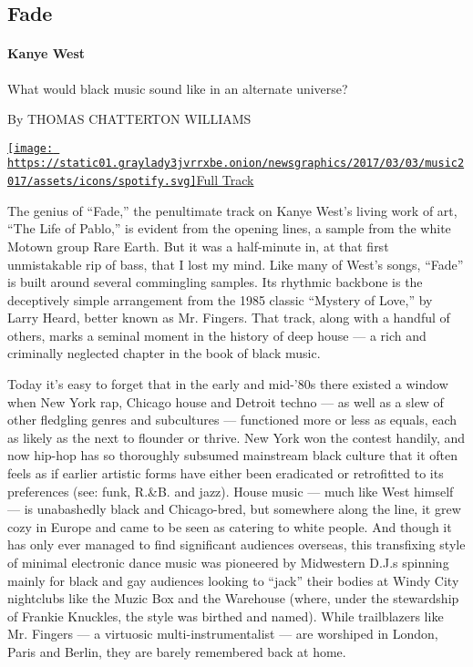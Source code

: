 \hypertarget{--fade}{%
\subsection{\texorpdfstring{ Fade}{  Fade}}\label{--fade}}

\hypertarget{kanye-west}{%
\paragraph{Kanye West}\label{kanye-west}}

What would black music sound like in an alternate universe?

By THOMAS CHATTERTON WILLIAMS

\href{https://open.spotify.com/track/3cCxoOgfi6hgt8MNteuiiD}{\texttt{[image: https://static01.graylady3jvrrxbe.onion/newsgraphics/2017/03/03/music2017/assets/icons/spotify.svg]}Full
Track}

The genius of ``Fade,'' the penultimate track on Kanye West's living
work of art, ``The Life of Pablo,'' is evident from the opening lines, a
sample from the white Motown group Rare Earth. But it was a half-minute
in, at that first unmistakable rip of bass, that I lost my mind. Like
many of West's songs, ``Fade'' is built around several commingling
samples. Its rhythmic backbone is the deceptively simple arrangement
from the 1985 classic ``Mystery of Love,'' by Larry Heard, better known
as Mr. Fingers. That track, along with a handful of others, marks a
seminal moment in the history of deep house --- a rich and criminally
neglected chapter in the book of black music.

Today it's easy to forget that in the early and mid-'80s there existed a
window when New York rap, Chicago house and Detroit techno --- as well
as a slew of other fledgling genres and subcultures --- functioned more
or less as equals, each as likely as the next to flounder or thrive. New
York won the contest handily, and now hip-hop has so thoroughly subsumed
mainstream black culture that it often feels as if earlier artistic
forms have either been eradicated or retrofitted to its preferences
(see: funk, R.\&B. and jazz). House music --- much like West himself ---
is unabashedly black and Chicago-bred, but somewhere along the line, it
grew cozy in Europe and came to be seen as catering to white people. And
though it has only ever managed to find significant audiences overseas,
this transfixing style of minimal electronic dance music was pioneered
by Midwestern D.J.s spinning mainly for black and gay audiences looking
to ``jack'' their bodies at Windy City nightclubs like the Muzic Box and
the Warehouse (where, under the stewardship of Frankie Knuckles, the
style was birthed and named). While trailblazers like Mr. Fingers --- a
virtuosic multi-instrumentalist --- are worshiped in London, Paris and
Berlin, they are barely remembered back at home.

